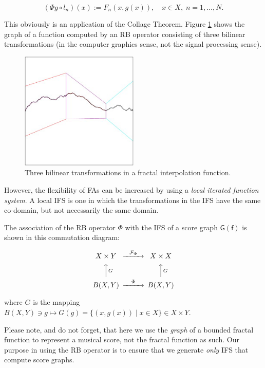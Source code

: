 \documentclass[english,11pt,letterpaper,onecolumn]{scrartcl}
\numberwithin{equation}{section}
\newcommand{\cF}{\mathcal{F}}
\newcommand{\be}{\begin{equation}}
\newcommand{\ee}{\end{equation}}
\begin{document}
\be\label{3.3}
(\Phi g \circ l_n) (x) := F_n (x, g(x)),\quad x\in X, \;n = 1, \ldots, N.
\ee


This obviously is an application of the Collage Theorem. Figure \ref{fig:fif}
shows the graph of a  function computed by an RB operator consisting of three
bilinear transformations (in the computer graphics sense, not the signal
processing sense).

\begin{figure}
\centerline{\includegraphics[width = 0.5\textwidth]{interp}}
\caption{\label{fig:fif} Three bilinear transformations in
a fractal interpolation function.\protect\footnotemark}
\end{figure}


However, the flexibility of FAs can be increased by using a
\textit{local iterated function system}. A local IFS is one in which the
transformations in the IFS have the same co-domain, but not necessarily the
same domain.

The association of the RB operator $\Phi$ with the IFS of a score graph $\mathsf{G(f)}$ is
shown in this commutation diagram:

\be
\begin{CD}
X\times Y @>\cF_\Phi>> X\times X\\
@AAGA                  @AAGA\\
B(X,Y) @>\Phi>>  B(X,Y)
\end{CD}
\ee

\noindent where $G$ is the mapping $B(X,Y)\ni g\longmapsto G(g) = \{(x, g(x))\mid x\in X\}\in X\times Y$.

Please note, and do not forget, that here we use the \textit{graph} of a bounded
fractal function to represent a musical score, not the fractal function as such.
Our purpose in using the RB operator is to ensure that we generate \textit{only} IFS
that compute score graphs.
\end{document}
